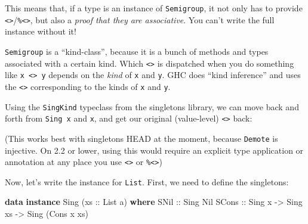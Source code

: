 \documentclass[]{article}
\newenvironment{Shaded}{\begin{snugshade}}{\end{snugshade}}
\newcommand{\DataTypeTok}[1]{\textcolor[rgb]{0.13,0.29,0.53}{#1}}
\newcommand{\FunctionTok}[1]{\textcolor[rgb]{0.00,0.00,0.00}{#1}}
\newcommand{\KeywordTok}[1]{\textcolor[rgb]{0.13,0.29,0.53}{\textbf{#1}}}
\newcommand{\NormalTok}[1]{#1}
\newcommand{\OtherTok}[1]{\textcolor[rgb]{0.56,0.35,0.01}{#1}}
\begin{document}
This means that, if a type is an instance of \texttt{Semigroup}, it not only has
to provide
\texttt{\textless{}\textgreater{}}/\texttt{\%\textless{}\textgreater{}}, but
also a \emph{proof that they are associative}. You can't write the full instance
without it!

\texttt{Semigroup} is a ``kind-class'', because it is a bunch of methods and
types associated with a certain kind. Which \texttt{\textless{}\textgreater{}}
is dispatched when you do something like
\texttt{x\ \textless{}\textgreater{}\ y} depends on the \emph{kind} of
\texttt{x} and \texttt{y}. GHC does ``kind inference'' and uses the
\texttt{\textless{}\textgreater{}} corresponding to the kinds of \texttt{x} and
\texttt{y}.

Using the \texttt{SingKind} typeclass from the singletons library, we can move
back and forth from \texttt{Sing\ x} and \texttt{x}, and get our original
(value-level) \texttt{\textless{}\textgreater{}} back:

\begin{Shaded}
\end{Shaded}

(This works best with singletons HEAD at the moment, because \texttt{Demote} is
injective. On 2.2 or lower, using this would require an explicit type
application or annotation at any place you use
\texttt{\textless{}\textgreater{}} or \texttt{\%\textless{}\textgreater{}})

Now, let's write the instance for \texttt{List}. First, we need to define the
singletons:

\begin{Shaded}
\begin{Highlighting}[]
\KeywordTok{data} \KeywordTok{instance} \DataTypeTok{Sing}\NormalTok{ (}\OtherTok{xs ::} \DataTypeTok{List}\NormalTok{ a) }\KeywordTok{where}
    \DataTypeTok{SNil}\OtherTok{  ::} \DataTypeTok{Sing} \DataTypeTok{Nil}
    \DataTypeTok{SCons}\OtherTok{ ::} \DataTypeTok{Sing}\NormalTok{ x }\OtherTok{->} \DataTypeTok{Sing}\NormalTok{ xs }\OtherTok{->} \DataTypeTok{Sing}\NormalTok{ (}\DataTypeTok{Cons}\NormalTok{ x xs)}
\end{Highlighting}
\end{Shaded}
\end{document}
